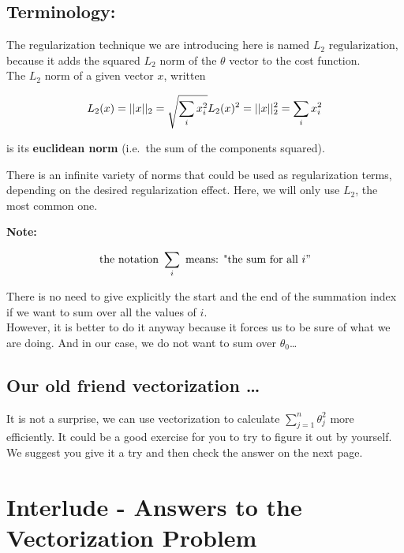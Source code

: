 \documentclass[]{article}
\begin{document}
\hypertarget{terminology}{%
\subsection{Terminology:}\label{terminology}}

The regularization technique we are introducing here is named
\textbf{\(L_2 \text{ regularization}\)}, because it adds the squared
\(L_2 \text{ norm}\) of the \(\theta\) vector to the cost function.\\
The \(L_2 \text{ norm}\) of a given vector \(x\), written

\large

\[
L_2(x) = ||x||_2 = \sqrt{\sum_i x_i^2 } \\
L_2(x)^2 = ||x||_2^2 = \sum_i x_i^2  \\
\] \normalsize

is its \textbf{euclidean norm} (i.e.~the sum of the components squared).

There is an infinite variety of norms that could be used as
regularization terms, depending on the desired regularization effect.
Here, we will only use \(L_2\), the most common one.

\textbf{Note:}

\large

\[
\text{the notation }\sum_i \\ \text{ means: "the sum for all } i"
\] \normalsize

There is no need to give explicitly the start and the end of the
summation index if we want to sum over all the values of \(i\).\\
However, it is better to do it anyway because it forces us to be sure of
what we are doing. And in our case, we do not want to sum over
\(\theta_0\)\ldots{}

\hypertarget{our-old-friend-vectorization}{%
\subsection{Our old friend vectorization
\ldots{}}\label{our-old-friend-vectorization}}

It is not a surprise, we can use vectorization to calculate
\(\sum_{j = 1}^n \theta_j^2\) more efficiently. It could be a good
exercise for you to try to figure it out by yourself. We suggest you
give it a try and then check the answer on the next page. \clearpage

\hypertarget{interlude---answers-to-the-vectorization-problem-1}{%
\section{Interlude - Answers to the Vectorization
Problem}\label{interlude---answers-to-the-vectorization-problem-1}}
\end{document}
